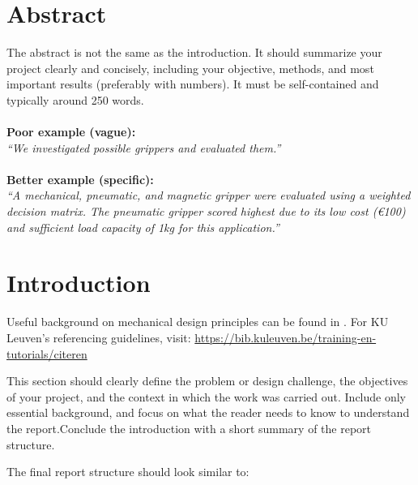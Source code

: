 \documentclass[11pt]{article}
\begin{document}


\section*{Abstract}

The abstract is not the same as the introduction. It should summarize your project clearly and concisely, including your objective, methods, and most important results (preferably with numbers). It must be self-contained and typically around 250 words.
\\ \\
\textbf{Poor example (vague):} \\
\textit{“We investigated possible grippers and evaluated them.”}
\\ \\
\textbf{Better example (specific):} \\
\textit{“A mechanical, pneumatic, and magnetic gripper were evaluated using a weighted decision matrix. The pneumatic gripper scored highest due to its low cost (€100) and sufficient load capacity of 1kg for this application.”}

\newpage
\tableofcontents

\newpage
{}
\setcounter{page}{1}

\section{Introduction}

Useful background on mechanical design principles can be found in \cite{PahlGerhard2007EDaSA, ChildsPeter2013MDEH}. For KU Leuven’s referencing guidelines, visit: \url{https://bib.kuleuven.be/training-en-tutorials/citeren}

This section should clearly define the problem or design challenge, the objectives of your project, and the context in which the work was carried out. Include only essential background, and focus on what the reader needs to know to understand the report.Conclude the introduction with a short summary of the report structure. 

The final report structure should look similar to:
\end{document}
